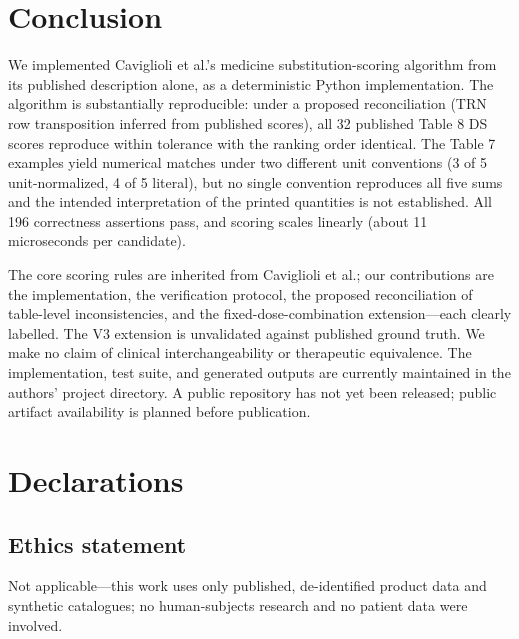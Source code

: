 \documentclass[12pt]{article}
\begin{document}
\section{Conclusion}
\label{sec:conclusion}

We implemented Caviglioli et al.\citep{caviglioli2025medicine}'s medicine substitution-scoring algorithm from its published description alone, as a deterministic Python implementation. The algorithm is substantially reproducible: under a proposed reconciliation (TRN row transposition inferred from published scores), all 32 published Table 8 DS scores reproduce within tolerance with the ranking order identical. The Table 7 examples yield numerical matches under two different unit conventions (3 of 5 unit-normalized, 4 of 5 literal), but no single convention reproduces all five sums and the intended interpretation of the printed quantities is not established. All 196 correctness assertions pass, and scoring scales linearly (about 11 microseconds per candidate).

The core scoring rules are inherited from Caviglioli et al.\citep{caviglioli2025medicine}; our contributions are the implementation, the verification protocol, the proposed reconciliation of table-level inconsistencies, and the fixed-dose-combination extension---each clearly labelled. The V3 extension is unvalidated against published ground truth. We make no claim of clinical interchangeability or therapeutic equivalence. The implementation, test suite, and generated outputs are currently maintained in the authors' project directory. A public repository has not yet been released; public artifact availability is planned before publication.

\section{Declarations}

\subsection{Ethics statement}
Not applicable---this work uses only published, de-identified product data and synthetic catalogues; no human-subjects research and no patient data were involved.
\end{document}
